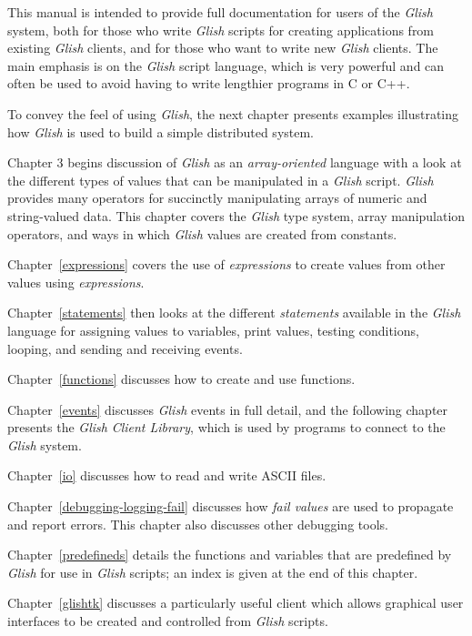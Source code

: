 This manual is intended to provide full documentation for users of the
{\em Glish} system, both for those who  write {\em Glish} scripts for
creating applications from existing {\em Glish} clients, and for those who want
to write new {\em Glish} clients.  The main emphasis is on the {\em Glish} script
language, which is very powerful and can often be used to avoid having
to write lengthier programs in C or C++.

To convey the feel of using {\em Glish}, the next chapter presents
examples illustrating how {\em Glish} is used to build a simple 
distributed system.

Chapter 3 begins discussion of {\em Glish} as an {\em array-oriented} language with a look
at the different types of values that can be manipulated in a {\em Glish} script.
{\em Glish} provides many operators
for succinctly manipulating arrays of numeric and string-valued data.
This chapter covers the {\em Glish} type system, array manipulation
operators, and ways in which {\em Glish} values are created from constants.

Chapter~\ref{expressions} covers the use of {\em expressions\/} to create
values from other values using {\em expressions\/}.

Chapter~\ref{statements} then looks at the different {\em statements}
available in the {\em Glish} language for assigning values to variables,
print values, testing conditions, looping, and sending and receiving
events.

Chapter~\ref{functions} discusses how to create and use functions.

Chapter~\ref{events} discusses {\em Glish} events in full detail, and
the following chapter presents the {\em Glish} {\em Client Library\/}, which
is used by programs to connect to the {\em Glish} system.

Chapter~\ref{io} discusses how to read and write {\sc ASCII} files.

Chapter~\ref{debugging-logging-fail} discusses how {\em fail values} are
used to propagate and report errors. This chapter also discusses other
debugging tools.

Chapter~\ref{predefineds} details the functions and variables that
are predefined by {\em Glish} for use in {\em Glish} scripts; an index is given
at the end of this chapter.

Chapter~\ref{glishtk} discusses a particularly useful client which allows
graphical user interfaces to be created and controlled from {\em Glish}
scripts.

